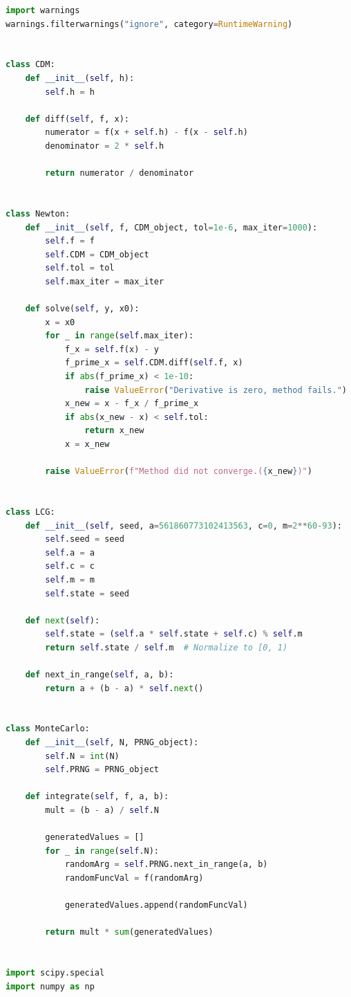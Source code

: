 \documentclass[a4paper, 14pt]{extarticle}
\begin{document}
\begin{center}
  \begin{lstlisting}[language=Python]
import warnings
warnings.filterwarnings("ignore", category=RuntimeWarning)


class CDM:
    def __init__(self, h):
        self.h = h
    
    def diff(self, f, x):
        numerator = f(x + self.h) - f(x - self.h)
        denominator = 2 * self.h

        return numerator / denominator


class Newton:
    def __init__(self, f, CDM_object, tol=1e-6, max_iter=1000):
        self.f = f
        self.CDM = CDM_object
        self.tol = tol 
        self.max_iter = max_iter

    def solve(self, y, x0):
        x = x0
        for _ in range(self.max_iter):
            f_x = self.f(x) - y
            f_prime_x = self.CDM.diff(self.f, x)
            if abs(f_prime_x) < 1e-10:
                raise ValueError("Derivative is zero, method fails.")
            x_new = x - f_x / f_prime_x
            if abs(x_new - x) < self.tol:
                return x_new
            x = x_new

        raise ValueError(f"Method did not converge.({x_new})")


class LCG:
    def __init__(self, seed, a=561860773102413563, c=0, m=2**60-93):
        self.seed = seed
        self.a = a
        self.c = c
        self.m = m
        self.state = seed

    def next(self):
        self.state = (self.a * self.state + self.c) % self.m
        return self.state / self.m  # Normalize to [0, 1)
    
    def next_in_range(self, a, b):
        return a + (b - a) * self.next()


class MonteCarlo:
    def __init__(self, N, PRNG_object):
        self.N = int(N)
        self.PRNG = PRNG_object
    
    def integrate(self, f, a, b):
        mult = (b - a) / self.N
        
        generatedValues = []
        for _ in range(self.N):
            randomArg = self.PRNG.next_in_range(a, b)
            randomFuncVal = f(randomArg)

            generatedValues.append(randomFuncVal)
        
        return mult * sum(generatedValues)

  
import scipy.special
import numpy as np



\end{lstlisting}
\end{center}
\end{document}
